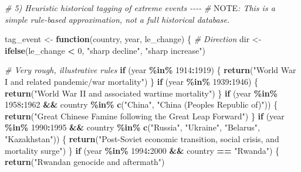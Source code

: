 \documentclass[
  11pt,
]{article}
\newenvironment{Shaded}{\begin{snugshade}}{\end{snugshade}}
\newcommand{\AlertTok}[1]{\textcolor[rgb]{0.94,0.16,0.16}{#1}}
\newcommand{\CommentTok}[1]{\textcolor[rgb]{0.56,0.35,0.01}{\textit{#1}}}
\newcommand{\ControlFlowTok}[1]{\textcolor[rgb]{0.13,0.29,0.53}{\textbf{#1}}}
\newcommand{\DecValTok}[1]{\textcolor[rgb]{0.00,0.00,0.81}{#1}}
\newcommand{\FunctionTok}[1]{\textcolor[rgb]{0.13,0.29,0.53}{\textbf{#1}}}
\newcommand{\NormalTok}[1]{#1}
\newcommand{\OtherTok}[1]{\textcolor[rgb]{0.56,0.35,0.01}{#1}}
\newcommand{\SpecialCharTok}[1]{\textcolor[rgb]{0.81,0.36,0.00}{\textbf{#1}}}
\newcommand{\StringTok}[1]{\textcolor[rgb]{0.31,0.60,0.02}{#1}}
\begin{document}
\begin{Shaded}
\begin{Highlighting}[]
\CommentTok{\# 5) Heuristic historical tagging of extreme events {-}{-}{-}{-}}
\CommentTok{\# }\AlertTok{NOTE}\CommentTok{: This is a simple rule{-}based approximation, not a full historical database.}

\NormalTok{tag\_event }\OtherTok{\textless{}{-}} \ControlFlowTok{function}\NormalTok{(country, year, le\_change) \{}
  \CommentTok{\# Direction}
\NormalTok{  dir }\OtherTok{\textless{}{-}} \FunctionTok{ifelse}\NormalTok{(le\_change }\SpecialCharTok{\textless{}} \DecValTok{0}\NormalTok{, }\StringTok{"sharp decline"}\NormalTok{, }\StringTok{"sharp increase"}\NormalTok{)}

  \CommentTok{\# Very rough, illustrative rules}
  \ControlFlowTok{if}\NormalTok{ (year }\SpecialCharTok{\%in\%} \DecValTok{1914}\SpecialCharTok{:}\DecValTok{1919}\NormalTok{) \{}
    \FunctionTok{return}\NormalTok{(}\StringTok{"World War I and related pandemic/war mortality"}\NormalTok{)}
\NormalTok{  \}}
  \ControlFlowTok{if}\NormalTok{ (year }\SpecialCharTok{\%in\%} \DecValTok{1939}\SpecialCharTok{:}\DecValTok{1946}\NormalTok{) \{}
    \FunctionTok{return}\NormalTok{(}\StringTok{"World War II and associated wartime mortality"}\NormalTok{)}
\NormalTok{  \}}
  \ControlFlowTok{if}\NormalTok{ (year }\SpecialCharTok{\%in\%} \DecValTok{1958}\SpecialCharTok{:}\DecValTok{1962} \SpecialCharTok{\&\&}\NormalTok{ country }\SpecialCharTok{\%in\%} \FunctionTok{c}\NormalTok{(}\StringTok{"China"}\NormalTok{, }\StringTok{"China (People\textquotesingle{}s Republic of)"}\NormalTok{)) \{}
    \FunctionTok{return}\NormalTok{(}\StringTok{"Great Chinese Famine following the Great Leap Forward"}\NormalTok{)}
\NormalTok{  \}}
  \ControlFlowTok{if}\NormalTok{ (year }\SpecialCharTok{\%in\%} \DecValTok{1990}\SpecialCharTok{:}\DecValTok{1995} \SpecialCharTok{\&\&}\NormalTok{ country }\SpecialCharTok{\%in\%} \FunctionTok{c}\NormalTok{(}\StringTok{"Russia"}\NormalTok{, }\StringTok{"Ukraine"}\NormalTok{, }\StringTok{"Belarus"}\NormalTok{, }\StringTok{"Kazakhstan"}\NormalTok{)) \{}
    \FunctionTok{return}\NormalTok{(}\StringTok{"Post{-}Soviet economic transition, social crisis, and mortality surge"}\NormalTok{)}
\NormalTok{  \}}
  \ControlFlowTok{if}\NormalTok{ (year }\SpecialCharTok{\%in\%} \DecValTok{1994}\SpecialCharTok{:}\DecValTok{2000} \SpecialCharTok{\&\&}\NormalTok{ country }\SpecialCharTok{==} \StringTok{"Rwanda"}\NormalTok{) \{}
    \FunctionTok{return}\NormalTok{(}\StringTok{"Rwandan genocide and aftermath"}\NormalTok{)}

\end{Highlighting}
\end{Shaded}
\end{document}
